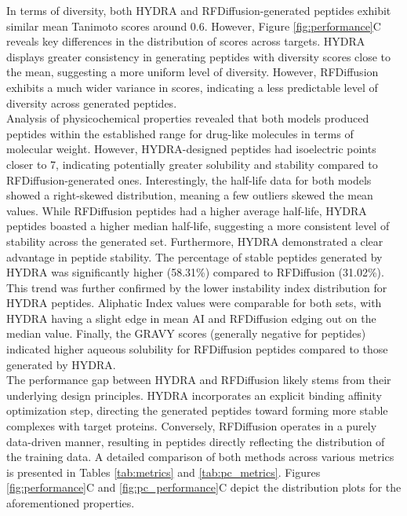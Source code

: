 In terms of diversity, both HYDRA and RFDiffusion-generated peptides exhibit similar mean Tanimoto scores around 0.6. However, Figure \ref{fig:performance}C reveals key differences in the distribution of scores across targets. HYDRA displays greater consistency in generating peptides with diversity scores close to the mean, suggesting a more uniform level of diversity. However, RFDiffusion exhibits a much wider variance in scores, indicating a less predictable level of diversity across generated peptides. \\

Analysis of physicochemical properties revealed that both models produced peptides within the established range for drug-like molecules in terms of molecular weight. However, HYDRA-designed peptides had isoelectric points closer to 7, indicating potentially greater solubility and stability compared to RFDiffusion-generated ones. Interestingly, the half-life data for both models showed a right-skewed distribution, meaning a few outliers skewed the mean values. While RFDiffusion peptides had a higher average half-life, HYDRA peptides boasted a higher median half-life, suggesting a more consistent level of stability across the generated set. Furthermore, HYDRA demonstrated a clear advantage in peptide stability. The percentage of stable peptides generated by HYDRA was significantly higher (58.31\%) compared to RFDiffusion (31.02\%). This trend was further confirmed by the lower instability index distribution for HYDRA peptides. Aliphatic Index values were comparable for both sets, with HYDRA having a slight edge in mean AI and RFDiffusion edging out on the median value. Finally, the GRAVY scores (generally negative for peptides) indicated higher aqueous solubility for RFDiffusion peptides compared to those generated by HYDRA. \\

The performance gap between HYDRA and RFDiffusion likely stems from their underlying design principles. HYDRA incorporates an explicit binding affinity optimization step, directing the generated peptides toward forming more stable complexes with target proteins. Conversely, RFDiffusion operates in a purely data-driven manner, resulting in peptides directly reflecting the distribution of the training data.
A detailed comparison of both methods across various metrics is presented in Tables \ref{tab:metrics} and \ref{tab:pc_metrics}. Figures \ref{fig:performance}C and \ref{fig:pc_performance}C depict the distribution plots for the aforementioned properties.

